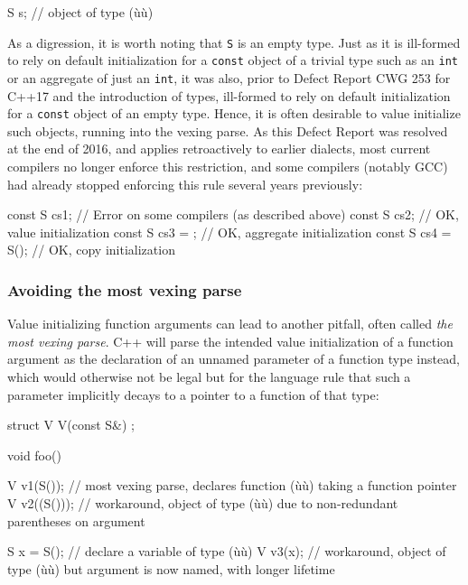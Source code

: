 \begin{emcppslisting}
S s{};  // object of type (ù{}ù)
\end{emcppslisting}

\noindent As a digression, it is worth noting that \lstinline!S! is an empty type.
Just as it is ill-formed to rely on default initialization for a
\lstinline!const! object of a trivial type such as an \lstinline!int! or an
aggregate of just an \lstinline!int!, it was also, prior to Defect Report
CWG 253 for C++17 and the introduction of
 types, ill-formed to rely on
default initialization for a \lstinline!const! object of an empty type.
Hence, it is often desirable to value initialize such objects, running
into the vexing parse. As this Defect Report was resolved at the end of
2016, and applies retroactively to earlier dialects, most current
compilers no longer enforce this restriction, and some compilers
(notably GCC) had already stopped enforcing this rule several years
previously:

\begin{emcppslisting}
const S cs1;        // Error on some compilers (as described above)
const S cs2{};      // OK, value initialization
const S cs3 = {};   // OK, aggregate initialization
const S cs4 = S();  // OK, copy initialization
\end{emcppslisting}


\subsubsection[Avoiding the most vexing parse]{Avoiding the most vexing parse}\label{avoiding-the-most-vexing-parse}

Value initializing function arguments can lead to another pitfall, often
called \emph{the most vexing parse}. C++ will parse the intended value
initialization of a function argument as the declaration of an unnamed
parameter of a function type instead, which would otherwise not be legal
but for the language rule that such a parameter implicitly decays to a
pointer to a function of that type:

\begin{emcppslisting}
struct V { V(const S&) { } };

void foo()
{
    V v1(S());    // most vexing parse, declares function (ù{}ù) taking a function pointer
    V v2((S()));  // workaround, object of type (ù{}ù) due to non-redundant parentheses on argument

    S x = S();    // declare a variable of type (ù{}ù)
    V v3(x);      // workaround, object of type (ù{}ù) but argument is now named, with longer lifetime
}
\end{emcppslisting}


